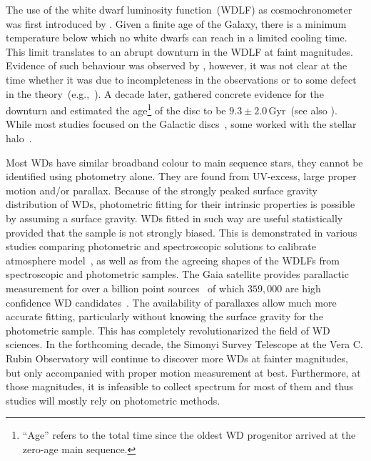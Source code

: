 \documentclass[fleqn,usenatbib]{rasti}
\begin{document}
The use of the white dwarf luminosity function~(WDLF) as cosmochronometer was
first introduced by \citet{1959ApJ...129..243S}. Given a finite age of the
Galaxy, there is a minimum temperature below which no white dwarfs can reach in
a limited cooling time. This limit translates to an abrupt downturn in the WDLF
at faint magnitudes. Evidence of such behaviour was observed by
\citet{1979ApJ...233..226L}, however, it was not clear at the time whether it
was due to incompleteness in the observations or to some defect in the
theory~(e.g.,~\citealp{1984ApJ...282..615I}). A decade later,
\citet{1987ApJ...315L..77W} gathered concrete evidence for the downturn and
estimated the age\footnote{``Age'' refers to the total time since the oldest
WD progenitor arrived at the zero-age main sequence.} of the disc to be
$9.3 \pm 2.0$\,Gyr~(see also \citealt{1988ApJ...332..891L}). While most studies
focused on the Galactic discs~\citep{1989LNP...328...15L, 1992ApJ...386..539W,
1995LNP...443...24O, 1998ApJ...497..294L, 1999MNRAS.306..736K,
2012ApJS..199...29G}, some worked with the stellar
halo~\citep{2006AJ....131..571H, 2011MNRAS.417...93R, 2017AJ....153...10M,
2019MNRAS.482..715L}. 
 
Most WDs have similar broadband colour to main sequence stars, they cannot be
identified using photometry alone. They are found from UV-excess, large
proper motion and/or parallax. Because of the strongly peaked surface gravity
distribution of WDs, photometric fitting for their intrinsic properties
is possible by assuming a surface gravity. WDs fitted in such way are useful
statistically provided that the sample is not strongly biased. This is
demonstrated in various studies comparing photometric and spectroscopic
solutions to calibrate atmosphere
model~\citep{2019ApJ...871..169G, 2019ApJ...882..106G}, as well as from the
agreeing shapes of the WDLFs from spectroscopic and photometric samples. The
Gaia satellite provides parallactic measurement for over a billion point
sources~\citep{2021A&A...649A...1G, 2021AJ....161..147B} of which $359,000$
are high confidence WD candidates~\citep[][hereafter, GF21]{2021MNRAS.508.3877G}.
The availability of parallaxes allow much more accurate fitting, particularly
without knowing the surface gravity for the photometric sample. This has
completely  revolutionarized the field of WD sciences. In the forthcoming decade,
the Simonyi Survey Telescope at the Vera C. Rubin Observatory will continue to
discover more WDs at fainter magnitudes, but only accompanied with proper
motion measurement at best. Furthermore, at those magnitudes, it is infeasible
to collect spectrum for most of them and thus studies will mostly rely on
photometric methods.
\end{document}
